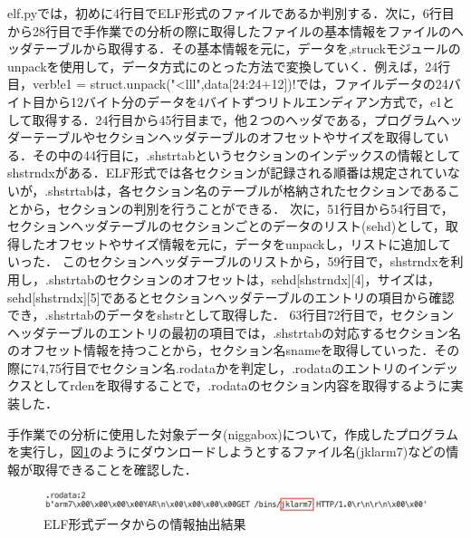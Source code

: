 \documentclass[dvipdfmx]{bta}
\begin{document}
elf.pyでは，初めに4行目でELF形式のファイルであるか判別する．次に，6行目から28行目で手作業での分析の際に取得したファイルの基本情報をファイルのヘッダテーブルから取得する．その基本情報を元に，データを,struckモジュールのunpackを使用して，データ方式にのとった方法で変換していく．例えば，24行目，verb!e1 = struct.unpack("<lll",data[24:24+12])!では，ファイルデータの24バイト目から12バイト分のデータを4バイトずつリトルエンディアン方式で，e1として取得する．24行目から45行目まで，他２つのヘッダである，プログラムヘッダーテーブルやセクションヘッダテーブルのオフセットやサイズを取得している．その中の44行目に，.shstrtabというセクションのインデックスの情報としてshstrndxがある．ELF形式では各セクションが記録される順番は規定されていないが，.shstrtabは，各セクション名のテーブルが格納されたセクションであることから，セクションの判別を行うことができる．
次に，51行目から54行目で，セクションヘッダテーブルのセクションごとのデータのリスト(sehd)として，取得したオフセットやサイズ情報を元に，データをunpackし，リストに追加していった．
このセクションヘッダテーブルのリストから，59行目で，shstrndxを利用し，.shstrtabのセクションのオフセットは，sehd[shstrndx][4]，サイズは，sehd[shstrndx][5]であるとセクションヘッダテーブルのエントリの項目から確認でき，.shstrtabのデータをshstrとして取得した．
63行目72行目で，セクションヘッダテーブルのエントリの最初の項目では，.shstrtabの対応するセクション名のオフセット情報を持つことから，セクション名snameを取得していった．その際に74,75行目でセクション名.rodataかを判定し，.rodataのエントリのインデックスとしてrdenを取得することで，.rodataのセクション内容を取得するように実装した．





手作業での分析に使用した対象データ(niggabox)について，作成したプログラムを実行し，図\ref{fig:jklarm7}のようにダウンロードしようとするファイル名(jklarm7)などの情報が取得できることを確認した．


\begin{figure}[htbp]
	\centering
 	\includegraphics[scale = 0.6]
	{jklarm7.png}
 	\caption{ELF形式データからの情報抽出結果}\label{fig:jklarm7}
\end{figure}
\end{document}
